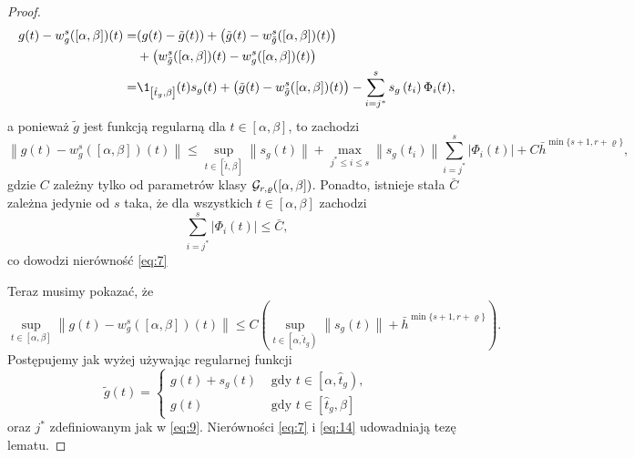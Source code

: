 \documentclass[oik, pdftex, man]{mgrwms}
\begin{document}
\begin{proof}
\begin{equation*}
            \begin{aligned}
                g(t)-w_{g}^{s}([\alpha, \beta])(t)=&(g(t)-\tilde{g}(t))+\left(\tilde{g}(t)-w_{\tilde{g}}^{s}([\alpha, \beta])(t)\right) \\
                &+\left(w_{\tilde{g}}^{s}([\alpha, \beta])(t)-w_{g}^{s}([\alpha, \beta])(t)\right) \\
                =& \1_{\left[\hat{t}_{g}, \beta\right]}(t) s_{g}(t)+\left(\tilde{g}(t)-w_{\tilde{g}}^{s}([\alpha, \beta])(t)\right)-\sum_{i=j^{*}}^{s} s_{g}\left(t_{i}\right) \Phi_{i}(t),
            \end{aligned}
        \end{equation*}
        a ponieważ $\tilde{g}$ jest funkcją regularną dla $t \in[\alpha, \beta]$, to zachodzi
        \begin{equation*}
            \left\|g(t)-w_{g}^{s}([\alpha, \beta])(t)\right\| \leq 
                \sup _{t \in[\hat{t}, \beta]}\left\|s_{g}(t)\right\|+\max _{j^{*} \leq i \leq s}\left\|s_{g}\left(t_{i}\right)\right\| \sum_{i=j^{*}}^{s}\left|\Phi_{i}(t)\right|+C \bar{h}^{\min \{s+1, r+\varrho\}},
        \end{equation*}
        gdzie $C$ zależny tylko od parametrów klasy $\mathcal{G}_{r,\varrho}([\alpha,\beta])$. Ponadto, istnieje stała $\bar{C}$ zależna jedynie od $s$ taka, że dla wszystkich $t \in[\alpha, \beta]$ zachodzi
        \begin{equation} \label{eq:13}
            \sum_{i=j^{*}}^{s}\left|\Phi_{i}(t)\right| \leq \bar{C},
        \end{equation}
        co dowodzi nierówność \eqref{eq:7}

        Teraz musimy pokazać, że
        \begin{equation} \label{eq:14}
            \sup _{t \in[\alpha, \beta]}\left\|g(t)-w_{g}^{s}([\alpha, \beta])(t)\right\| \leq C\left(\sup _{t \in\left[\alpha, \hat{t}_{g}\right)}\left\|s_{g}(t)\right\|+\bar{h}^{\min \{s+1, r+\varrho\}}\right).
        \end{equation}
        Postępujemy jak wyżej używając regularnej funkcji
        \begin{equation} \label{eq:15:tilde_g_z_plusem}
            \tilde{g}(t)= \begin{cases}
                g(t)+s_{g}(t)    & \text { gdy } t \in\left[\alpha, \hat{t}_{g}\right), \\ 
                g(t)             & \text { gdy } t \in\left[\hat{t}_{g}, \beta\right]
            \end{cases}
        \end{equation}
        oraz $j^{*}$ zdefiniowanym jak w \eqref{eq:9}.
        Nierówności \eqref{eq:7} i \eqref{eq:14} udowadniają tezę lematu.
    \end{proof}
\end{document}
